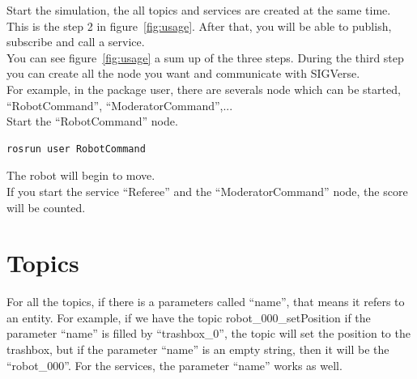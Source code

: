 \documentclass[notitlepage]{report}
\begin{document}
Start the simulation, the all topics and services are created at the same time. This is the step 2 in figure~\ref{fig:usage}. After that, you will be able to publish, subscribe and call a service.\\
You can see figure~\ref{fig:usage} a sum up of the three steps. During the third step you can create all the node you want and communicate with SIGVerse.\\
For example, in the package user, there are severals node which can be started, ``RobotCommand'', ``ModeratorCommand'',...\\
Start the ``RobotCommand'' node.
\begin{lstlisting}[language=bash]
rosrun user RobotCommand
\end{lstlisting}
The robot will begin to move.\\
If you start the service ``Referee'' and the ``ModeratorCommand'' node, the score will be counted.

\noindent\begin{minipage}{\linewidth}%
\label{fig:usage}  
\end{minipage}

\chapter{Topics}
For all the topics, if there is a parameters called ``name'', that means it refers to an entity. For example, if we have the topic robot\_000\_setPosition if the parameter ``name'' is filled by ``trashbox\_0'', the topic will set the position to the trashbox, but if the parameter ``name'' is an empty string, then it will be the ``robot\_000''. For the services, the parameter ``name'' works as well.
\end{document}
